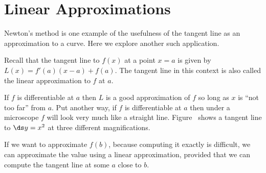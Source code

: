 \section{Linear Approximations}{}{}
\nobreak
Newton's method is one example of the usefulness of the tangent line
as an approximation to a curve. Here we explore another such
application.

Recall that the tangent line to $f(x)$ at a point $x=a$ is given by
$L(x) = f'(a) (x-a) + f(a)$.  The tangent line in this context is also
called the {\dfont linear approximation\/}
to $f$ at $a$.

If $f$ is differentiable at $a$ then $L$ is a good approximation of
$f$ so long as $x$ is ``not too far'' from $a$.  Put another way, if
$f$ is differentiable at $a$ then under a microscope $f$ will look
very much like a straight line. Figure~ shows a tangent line to $\ds y=x^2$ at three different
magnifications. 

If we want to approximate $f(b)$,
because computing it exactly is difficult, we can approximate the
value using a linear approximation, provided that we can compute the
tangent line at some $a$ close to $b$.


